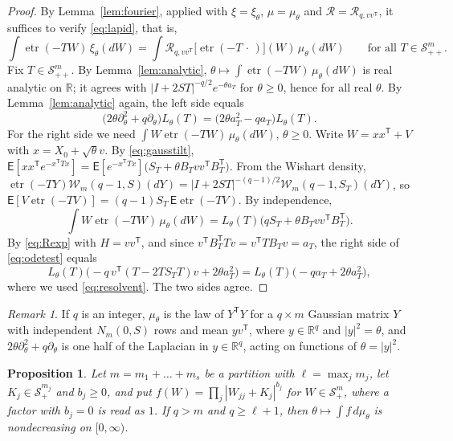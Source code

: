 \documentclass{amsart}
\newtheorem{proposition}[theorem]{Proposition}
\theoremstyle{definition}
\theoremstyle{remark}
\newtheorem{remark}[theorem]{Remark}
\numberwithin{equation}{section}
\newcommand{\R}{\mathbb{R}}
\newcommand{\E}{\mathsf{E}}
\newcommand{\Sym}{\mathcal{S}}
\newcommand{\W}{\mathcal{W}}
\newcommand{\Rop}{\mathcal{R}}
\newcommand{\etr}{\operatorname{etr}}
\begin{document}
\begin{proof}
By Lemma~\ref{lem:fourier}, applied with $\xi=\xi_\theta$, $\mu=\mu_\theta$ and $\Rop=\Rop_{q,vv^{\mathsf T}}$, it suffices to verify \eqref{eq:lapid}, that is,
\[
\int\etr(-TW)\,\xi_\theta(dW)=\int\Rop_{q,vv^{\mathsf T}}\bigl[\etr(-T\,\cdot\,)\bigr](W)\,\mu_\theta(dW)\qquad\text{for all }T\in\Sym^m_{++}.
\]
Fix $T\in\Sym^m_{++}$. By Lemma~\ref{lem:analytic}, $\theta\mapsto\int\etr(-TW)\,\mu_\theta(dW)$ is real analytic on $\R$; it agrees with $|I+2ST|^{-q/2}e^{-\theta a_T}$ for $\theta\ge0$, hence for all real $\theta$. By Lemma~\ref{lem:analytic} again, the left side equals
\[
\bigl(2\theta\partial_\theta^2+q\partial_\theta\bigr)L_\theta(T)=\bigl(2\theta a_T^2-qa_T\bigr)L_\theta(T).
\]
For the right side we need $\int W\etr(-TW)\,\mu_\theta(dW)$, $\theta\ge0$. Write $W=xx^{\mathsf T}+V$ with $x=X_0+\sqrt\theta v$. By \eqref{eq:gausstilt}, $\E[xx^{\mathsf T}e^{-x^{\mathsf T}Tx}]=\E[e^{-x^{\mathsf T}Tx}]\bigl(S_T+\theta B_Tvv^{\mathsf T}B_T^{\mathsf T}\bigr)$. From the Wishart density, $\etr(-TY)\W_m(q-1,S)(dY)=|I+2ST|^{-(q-1)/2}\W_m(q-1,S_T)(dY)$, so $\E[V\etr(-TV)]=(q-1)S_T\,\E\etr(-TV)$. By independence,
\[
\int W\etr(-TW)\,\mu_\theta(dW)=L_\theta(T)\bigl(qS_T+\theta B_Tvv^{\mathsf T}B_T^{\mathsf T}\bigr).
\]
By \eqref{eq:Rexp} with $H=vv^{\mathsf T}$, and since $v^{\mathsf T}B_T^{\mathsf T}Tv=v^{\mathsf T}TB_Tv=a_T$, the right side of \eqref{eq:odetest} equals
\[
L_\theta(T)\bigl(-q\,v^{\mathsf T}(T-2TS_TT)v+2\theta a_T^2\bigr)=L_\theta(T)\bigl(-qa_T+2\theta a_T^2\bigr),
\]
where we used \eqref{eq:resolvent}. The two sides agree.
\end{proof}

\begin{remark}
If $q$ is an integer, $\mu_\theta$ is the law of $Y^{\mathsf T}Y$ for a $q\times m$ Gaussian matrix $Y$ with independent $N_m(0,S)$ rows and mean $yv^{\mathsf T}$, where $y\in\R^q$ and $|y|^2=\theta$, and $2\theta\partial_\theta^2+q\partial_\theta$ is one half of the Laplacian in $y\in\R^q$, acting on functions of $\theta=|y|^2$.
\end{remark}

\begin{proposition}\label{prop:rankone}
Let $m=m_1+\dots+m_s$ be a partition with $\ell=\max_jm_j$, let $K_j\in\Sym^{m_j}_+$ and $b_j\ge0$, and put $f(W)=\prod_j|W_{jj}+K_j|^{b_j}$ for $W\in\Sym^m_+$, where a factor with $b_j=0$ is read as $1$. If $q>m$ and $q\ge\ell+1$, then $\theta\mapsto\int f\,d\mu_\theta$ is nondecreasing on $[0,\infty)$.
\end{proposition}
\end{document}
